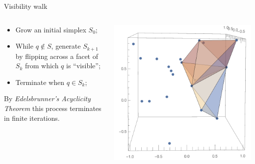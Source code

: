 \documentclass[xcolor=dvipsnames]{beamer}
\begin{document}
\begin{frame}{Visibility walk}
\begin{columns}
\begin{column}{.48\textwidth}
\begin{itemize}
\item Grow an initial simplex $S_0$;
\item While $q \not\in S$, generate $S_{k+1}$ by flipping across a facet of
$S_k$ from which $q$ is ``visible'';
\item Terminate when $q\in S_k$;
\end{itemize}
\medskip
By {\it Edelsbrunner's Acyclicity Theorem} this process terminates in finite
iterations.
\end{column}
\begin{column}{.48\textwidth}
\includegraphics[width=\textwidth]{DelaunayWalk.pdf}
\end{column}
\end{columns}
\end{frame}
\end{document}
